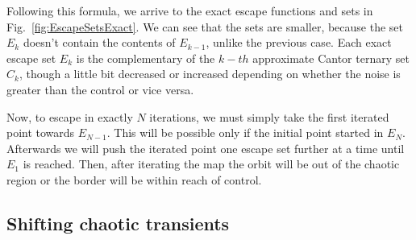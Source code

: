 Following this formula, we arrive to the exact escape functions and sets in Fig.~\ref{fig:EscapeSetsExact}. We can see that the sets are smaller, because the set $E_k$ doesn't contain the contents of $E_{k-1}$, unlike the previous case. Each exact escape set $E_k$ is the complementary of the $k-th$ approximate Cantor ternary set $C_k$, though a little bit decreased or increased depending on whether the noise is greater than the control or vice versa. 

Now, to escape in exactly $N$ iterations, we must simply take the first iterated point towards $E_{N-1}$. This will be possible only if the initial point started in $E_N$. Afterwards we will push the iterated point one escape set further at a time until $E_1$ is reached. Then, after iterating the map the orbit will be out of the chaotic region or the border will be within reach of control.




\subsection{Shifting chaotic transients}



